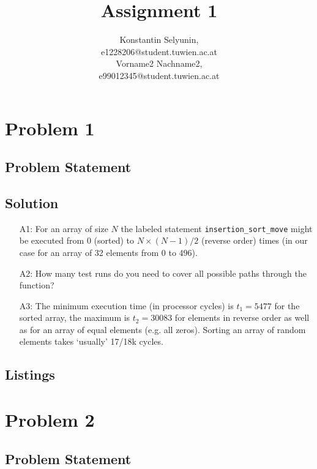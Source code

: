 \documentclass[12pt,a4paper,titlepage,oneside]{article}
\title{Assignment 1}
\author{Konstantin Selyunin, \matrnr 1228206   \\
         {\small e1228206@student.tuwien.ac.at} \\
        Vorname2 Nachname2, \matrnr 99012345 \\
         {\small e99012345@student.tuwien.ac.at}
}
\begin{document}
\maketitle


\section{Problem 1}

\subsection{Problem Statement}


\subsection{Solution}
\begin{itemize}
\item[A1:]
For an array of size $N$ the labeled statement
\texttt{insertion\_sort\_move} might be executed from $0$ (sorted) to
$N\times(N-1)/2$ (reverse order) times (in our case for an array of 32 
elements from 0 to 496). 

\item[A2:] How many test runs do you need to cover all possible paths through
           the function?
\item[A3:] 
The minimum execution time (in processor cycles) is $t_1 = 5477$
for the sorted array, the maximum is $t_2 = 30083$ for elements in
reverse order as well as for an array of equal elements (e.g. all
zeros). Sorting an array of random elements takes `usually' 17/18k cycles.

\end{itemize}

\subsection{Listings}

\newpage
\section{Problem 2}

\subsection{Problem Statement}

\end{document}
